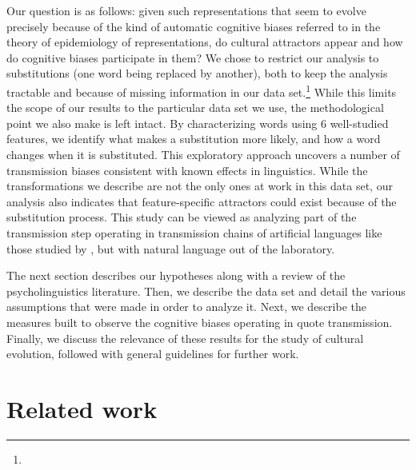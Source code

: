 \begin{new}
Our question is as follows: given such representations that seem to evolve precisely because of the kind of automatic cognitive biases referred to in the theory of epidemiology of representations, do cultural attractors appear and how do cognitive biases participate in them?
We chose to restrict our analysis to substitutions (one word being replaced by another), both to keep the analysis tractable and because of missing information in our data set.\footnote{
}
While this limits the scope of our results to the particular data set we use, the methodological point we also make is left intact.
By characterizing words using 6 well-studied features, we identify what makes a substitution more likely, and how a word changes when it is substituted.
This exploratory approach uncovers a number of transmission biases consistent with known effects in linguistics.
While the transformations we describe are not the only ones at work in this data set, our analysis also indicates that feature-specific attractors could exist because of the substitution process.
This study can be viewed as analyzing part of the transmission step operating in transmission chains of artificial languages like those studied by \citet{kirby_cumulative_2008}, but with natural language out of the laboratory.

The next section %
describes our hypotheses along with a review of the psycholinguistics literature.
Then, we describe the data set and detail the various assumptions that were made in order to analyze it.
Next, we describe the measures built to observe the cognitive biases operating in quote transmission.
Finally, we discuss the relevance of these results for the study of cultural evolution, followed with general guidelines for further work.%

\end{new}


\section{Related work} %
\label{sec:related}

